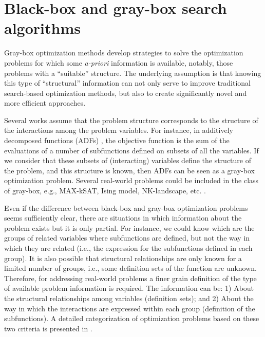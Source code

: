  \section{Black-box and gray-box search algorithms}   \label{sec:BLACK_VS_GRAY}


 
 Gray-box optimization methods \cite{Chicano_et_2014,Whitley:2015}  develop strategies to solve the optimization problems for which some \emph{a-priori} information is available, notably, those problems with a  ``suitable'' structure. The underlying assumption is that knowing this type of ``structural'' information can not only serve to improve traditional search-based optimization methods, but also to create significantly novel and more efficient approaches.

   Several works assume that the problem structure corresponds to the structure of the  interactions among the problem variables.  For instance, in additively decomposed functions (ADFs) \cite{Muhlenbein_et_al:1999},  the objective function is the  sum of the evaluations of a number of subfunctions defined on subsets of all the variables. If we consider that these subsets of (interacting) variables define the structure of the problem, and this structure is known, then ADFs can be seen as a gray-box optimization problem. Several real-world problems could be included in the class of  gray-box, e.g., MAX-kSAT, Ising model, NK-landscape, etc. \cite{Whitley:2015}.
  
   Even if the difference between black-box and gray-box optimization problems seems sufficiently clear,  there are situations in which information about the problem exists but it is only partial. For instance, we could know which are the groups of related variables where subfunctions are defined, but not the way in which they are related (i.e., the expression for the subfunctions defined in each group).  It is also possible that structural relationships are only known for a limited number of groups, i.e., some definition sets of the function are unknown.  Therefore, for addressing real-world problems a finer grain definition of the type of available problem information  is required.  The information can be: 1) About the structural relationships among variables (definition sets); and  2) About the way in which the interactions are expressed within each group (definition of the subfunctions).  A detailed categorization of optimization problems based on these two criteria is presented in \cite{Santana:2017a}. 

